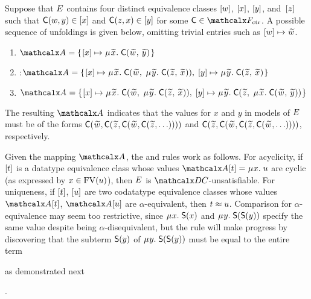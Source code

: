\begin{examplex}
Suppose that $E$ contains four distinct equivalence classes $[w]$, $[x]$, $[y]$, and~$[z]$
such that $\textsf{C}(w,y) \in [x]$ and $\textsf{C}(z,x) \in [y]$ for some $\const{C} \in \Ctr$.
A possible sequence of unfoldings is given below, omitting
trivial entries such as $\ec{w} \mapsto {\Varec{w}}$.
%
\begin{enumerate}
\item \noindent{}$\Val = \{\vthinspace  \ec{x} \mapsto \MU {\Varec{x}}.\; \const{C}( {\Varec{w}},\, {\Varec{y}} ) \vthinspace\}$
\item \noindent{}:\enskip$\Val = \{\vthinspace  \ec{x} \mapsto \MU {\Varec{x}}.\; \const{C}( {\Varec{w}},\; \MU {\Varec{y}}.\; \const{C}( {\Varec{z}},\, {\Varec{x}} ) ),\;
  \ec{y} \mapsto \MU {\Varec{y}}.\; \const{C}( {\Varec{z}},\, {\Varec{x}} ) \vthinspace\}$
\item \noindent{}$\Val = \{\vthinspace  \ec{x} \mapsto \MU {\Varec{x}}.\; \const{C}( {\Varec{w}},\; \MU {\Varec{y}}.\; \const{C}( {\Varec{z}},\, {\Varec{x}} ) ),\;
  \ec{y} \mapsto \MU {\Varec{y}}.\; \const{C}( {\Varec{z}},\; \MU {\Varec{x}}.\; \const{C}( {\Varec{w}},\, {\Varec{y}} ) ) \vthinspace\}$
\end{enumerate}
%
The resulting $\Val$ indicates that the values for $x$ and $y$ in models of $E$
must be of the forms $\const{C}( {\Varec{w}}, \const{C}( {\Varec{z}},\allowbreak \const{C}( {\Varec{w}},\allowbreak \const{C}( {\Varec{z}},\ldots ))))$
and $\const{C}( {\Varec{z}}, \const{C}( {\Varec{w}}, \const{C}( {\Varec{z}}, \const{C}( {\Varec{w}}, \ldots ))))$,
respectively. %
\xend
\end{examplex}

Given the mapping $\Val$, the  and  rules work as follows.
For acyclicity, if $[t]$ is a datatype equivalence class
whose values $\Val \ec{t} = \MU x.\; u$ are cyclic
(as expressed by $x \in \mathrm{FV}( u )$),
then $E$ is $\thD$-unsatisfiable.
For uniqueness, if $[t]$, $[u]$ are two codatatype equivalence classes
whose values $\Val \ec{t}$, $\Val \ec{u}$ are $\alpha$-equivalent,
then $t \approx u$. Comparison for $\alpha$-equivalence may seem too restrictive, since
$\MU x.\; \const{S}(x)$ and $\MU y.\; \const{S}(\const{S}(y))$ specify the same
value despite being $\alpha$-disequivalent, but the rule will
make progress by discovering that the subterm $\textsf{S}(y)$ of $\MU y.\;
\const{S}(\const{S}(y))$ must be equal to the entire term\begin{rep}
as demonstrated next\end{rep}.

